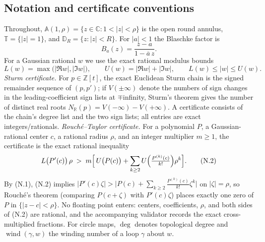 \subsection*{Notation and certificate conventions}
Throughout, \(\mathbb A(1,\rho)=\{z\in\mathbb C:1<|z|<\rho\}\) is the open round annulus, \(\mathbb T=\{|z|=1\}\), and \(\mathbb D_R=\{z:|z|<R\}\). For \(|a|<1\) the Blaschke factor is
\[ B_a(z)=\frac{z-a}{1-\overline a\,z}. \]
For a Gaussian rational \(w\) we use the exact rational modulus bounds
\[ L(w)=\max\bigl(|\Re w|,|\Im w|\bigr),\qquad U(w)=|\Re w|+|\Im w|,\qquad L(w)\le|w|\le U(w). \tag{N.1} \]
\emph{Sturm certificate.} For \(p\in\mathbb Z[t]\), the exact Euclidean Sturm chain is the signed remainder sequence of \((p,p')\); if \(V(\pm\infty)\) denote the numbers of sign changes in the leading-coefficient sign lists at \(\mp\)infinity, Sturm's theorem gives the number of distinct real roots \(N_{\mathbb R}(p)=V(-\infty)-V(+\infty)\). A certificate consists of the chain's degree list and the two sign lists; all entries are exact integers/rationals.
\emph{Rouch\'e--Taylor certificate.} For a polynomial \(P\), a Gaussian-rational center \(c\), a rational radius \(\rho\), and an integer multiplier \(m\ge1\), the certificate is the exact rational inequality
\[ L\bigl(P'(c)\bigr)\,\rho\;>\;m\Bigl[\,U\bigl(P(c)\bigr)+\sum_{k\ge2}U\Bigl(\tfrac{P^{(k)}(c)}{k!}\Bigr)\rho^{k}\Bigr]. \tag{N.2} \]
By (N.1), (N.2) implies \(|P'(c)\zeta|>\bigl|P(c)+\sum_{k\ge2}\tfrac{P^{(k)}(c)}{k!}\zeta^{k}\bigr|\) on \(|\zeta|=\rho\), so Rouch\'e's theorem (comparing \(P(c+\zeta)\) with \(P'(c)\zeta\)) places exactly one zero of \(P\) in \(\{|z-c|<\rho\}\). No floating point enters: centers, coefficients, \(\rho\), and both sides of (N.2) are rational, and the accompanying validator records the exact cross-multiplied fractions.
For circle maps, \(\deg\) denotes topological degree and \(\operatorname{wind}(\gamma,w)\) the winding number of a loop \(\gamma\) about \(w\).